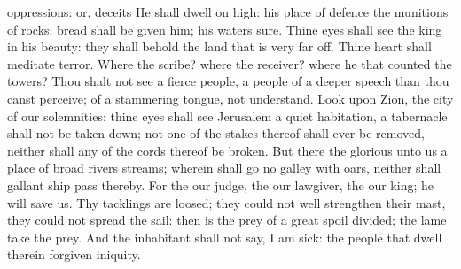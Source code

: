 {{oppressions: or, deceits}
He shall
dwell on
high: his place of
defence
{} the
munitions of
rocks:
bread shall be
given him; his
waters
{}
sure.
Thine
eyes shall
see the
king in his
beauty: they shall
behold the
land that is very far
off.
Thine
heart shall
meditate
terror. Where
{} the
scribe? where
{} the
receiver? where
{} he that
counted the
towers?
Thou shalt not
see a
fierce
people, a
people of a
deeper
speech than thou canst
perceive; of a
stammering
tongue,
{} not
understand.
Look upon
Zion, the
city of our
solemnities: thine
eyes shall
see
Jerusalem a
quiet
habitation, a
tabernacle
{} shall not be taken
down; not one of the
stakes thereof shall
ever be
removed, neither shall any of the
cords thereof be
broken.
But there the
glorious
{}
{} unto us a
place of
broad
rivers
{}
streams; wherein shall
go
no
galley with
oars, neither shall
gallant
ship
pass thereby.
For the
{}
{} our
judge, the
{}
{} our
lawgiver, the
{}
{} our
king; he will
save us.
Thy
tacklings are
loosed; they could not
well
strengthen their
mast, they could not
spread the
sail: then is the
prey of a
great
spoil
divided; the
lame
take the
prey.
And the
inhabitant shall not
say, I am
sick: the
people that
dwell therein
{}
forgiven
{}
iniquity.

}
